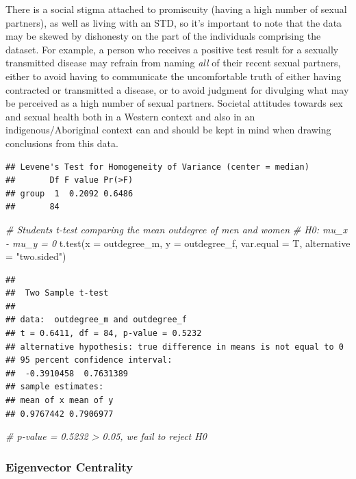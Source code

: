 \documentclass[12pt]{article}
\newenvironment{Shaded}{\begin{snugshade}}{\end{snugshade}}
\newcommand{\AttributeTok}[1]{\textcolor[rgb]{0.77,0.63,0.00}{#1}}
\newcommand{\CommentTok}[1]{\textcolor[rgb]{0.56,0.35,0.01}{\textit{#1}}}
\newcommand{\FunctionTok}[1]{\textcolor[rgb]{0.00,0.00,0.00}{#1}}
\newcommand{\NormalTok}[1]{#1}
\newcommand{\StringTok}[1]{\textcolor[rgb]{0.31,0.60,0.02}{#1}}
\begin{document}
There is a social stigma attached to promiscuity (having a high number of sexual partners), as well as living with an STD, so it's important to note that the data may be skewed by dishonesty on the part of the individuals comprising the dataset. For example, a person who receives a positive test result for a sexually transmitted disease may refrain from naming \emph{all} of their recent sexual partners, either to avoid having to communicate the uncomfortable truth of either having contracted or transmitted a disease, or to avoid judgment for divulging what may be perceived as a high number of sexual partners. Societal attitudes towards sex and sexual health both in a Western context and also in an indigenous/Aboriginal context can and should be kept in mind when drawing conclusions from this data.

\begin{verbatim}
## Levene's Test for Homogeneity of Variance (center = median)
##       Df F value Pr(>F)
## group  1  0.2092 0.6486
##       84
\end{verbatim}

\begin{Shaded}
\begin{Highlighting}[]
\CommentTok{\# Student\textquotesingle{}s t{-}test comparing the mean outdegree of men and women}
\CommentTok{\# H0: mu\_x {-} mu\_y = 0}
\FunctionTok{t.test}\NormalTok{(}\AttributeTok{x =}\NormalTok{ outdegree\_m, }
       \AttributeTok{y =}\NormalTok{ outdegree\_f,}
       \AttributeTok{var.equal =}\NormalTok{ T, }\AttributeTok{alternative =} \StringTok{"two.sided"}\NormalTok{)}
\end{Highlighting}
\end{Shaded}

\begin{verbatim}
## 
##  Two Sample t-test
## 
## data:  outdegree_m and outdegree_f
## t = 0.6411, df = 84, p-value = 0.5232
## alternative hypothesis: true difference in means is not equal to 0
## 95 percent confidence interval:
##  -0.3910458  0.7631389
## sample estimates:
## mean of x mean of y 
## 0.9767442 0.7906977
\end{verbatim}

\begin{Shaded}
\begin{Highlighting}[]
\CommentTok{\# p{-}value = 0.5232 \textgreater{} 0.05, we fail to reject H0}
\end{Highlighting}
\end{Shaded}

\hypertarget{eigenvector-centrality}{%
\subsubsection{Eigenvector Centrality}\label{eigenvector-centrality}}
\end{document}
